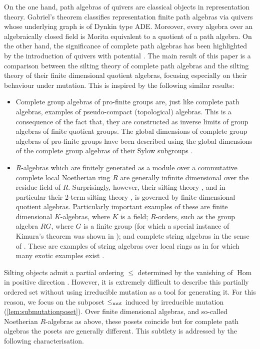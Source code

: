\documentclass[11pt]{amsart}
\DeclareMathOperator{\Hom}{\mathrm{Hom}}
\theoremstyle{definition}
\begin{document}
On the one hand, path algebras of quivers are classical objects in representation theory. Gabriel's theorem \cite{Gabriel1972} classifies representation finite path algebras via quivers whose underlying graph is of Dynkin type ADE. Moreover, every algebra over an algebraically closed field is Morita equivalent to a quotient of a path algebra. On the other hand, the significance of complete path algebras has been highlighted by the introduction of quivers with potential \cite{DWZ2008, DWZ2010}. The main result of this paper is a comparison between the silting theory of complete path algebras and the silting theory of their finite dimensional quotient algebras, focusing especially on their behaviour under mutation. This is inspired by the following similar results:
\begin{itemize}
	\item Complete group algebras of pro-finite groups are, just like complete path algebras, examples of pseudo-compact (topological) algebras. This is a consequence of the fact that, they are constructed as inverse limits of group algebras of finite quotient groups. The global dimensions of complete group algebras of pro-finite groups have been described using the global dimensions of the complete group algebras of their Sylow subgroups \cite{Brumer1966}.
	\item $R$-algebras which are finitely generated as a module over a commutative complete local Noetherian ring $R$ are generally infinite dimensional over the residue field of $R$. Surprisingly, however, their silting theory \cite{Gnedin2022}, and in particular their 2-term silting theory \cite{Kimura2024}, is governed by finite dimensional quotient algebras. Particularly important examples of these are finite dimensional $K$-algebras, where $K$ is a field; $R$-orders, such as the group algebra $RG$, where $G$ is a finite group (for which a special instance of Kimura's theorem was shown in \cite{EJR2018}); and complete string algebras in the sense of \cite{Ricke}. These are examples of string algebras over local rings as in \cite{BT2025} for which many exotic examples exist \cite{BT2024}.
\end{itemize}


Silting objects admit a partial ordering $\leq$ determined by the vanishing of $\Hom$ in positive direction \cite{Aihara_2012}. However, it is extremely difficult to describe this partially ordered set without using irreducible mutation as a tool for generating it. For this reason, we focus on the subposet $\leq_{\textnormal{mut}}$ induced by irreducible mutation (\cref{lem:submutationposet}). Over finite dimensional algebras, and so-called Noetherian $R$-algebras as above, these posets coincide but for complete path algebras the posets are generally different. This subtlety is addressed by the following characterisation.
\end{document}
